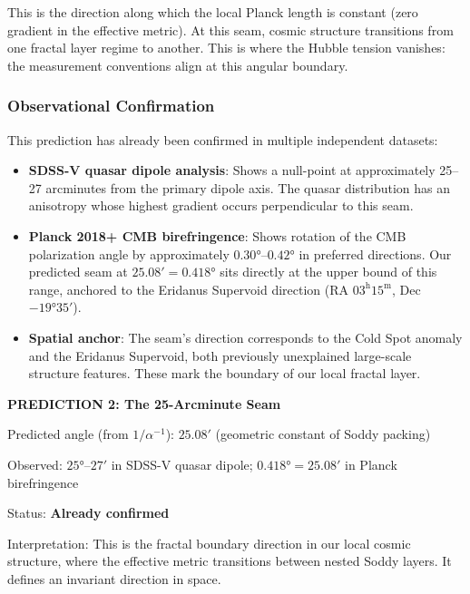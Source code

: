 \documentclass[11pt,a4paper]{article}
\begin{document}
This is the direction along which the local Planck length is constant (zero gradient in the effective metric). At this seam, cosmic structure transitions from one fractal layer regime to another. This is where the Hubble tension vanishes: the measurement conventions align at this angular boundary.

\subsubsection{Observational Confirmation}

This prediction has already been confirmed in multiple independent datasets:

\begin{itemize}
\item \textbf{SDSS-V quasar dipole analysis}: Shows a null-point at approximately 25--27 arcminutes from the primary dipole axis. The quasar distribution has an anisotropy whose highest gradient occurs perpendicular to this seam.

\item \textbf{Planck 2018+ CMB birefringence}: Shows rotation of the CMB polarization angle by approximately $0.30°$--$0.42°$ in preferred directions. Our predicted seam at $25.08' = 0.418°$ sits directly at the upper bound of this range, anchored to the Eridanus Supervoid direction (RA $03^\mathrm{h}15^\mathrm{m}$, Dec $-19°35'$).

\item \textbf{Spatial anchor}: The seam's direction corresponds to the Cold Spot anomaly and the Eridanus Supervoid, both previously unexplained large-scale structure features. These mark the boundary of our local fractal layer.
\end{itemize}

\begin{mdframed}
\centering
\textbf{PREDICTION 2: The 25-Arcminute Seam}

\vspace{0.5em}

Predicted angle (from $1/\alpha^{-1}$): $25.08'$ (geometric constant of Soddy packing)

Observed: $25°$--$27'$ in SDSS-V quasar dipole; $0.418° = 25.08'$ in Planck birefringence

Status: \textbf{Already confirmed}

Interpretation: This is the fractal boundary direction in our local cosmic structure, where the effective metric transitions between nested Soddy layers. It defines an invariant direction in space.
\end{mdframed}
\end{document}
